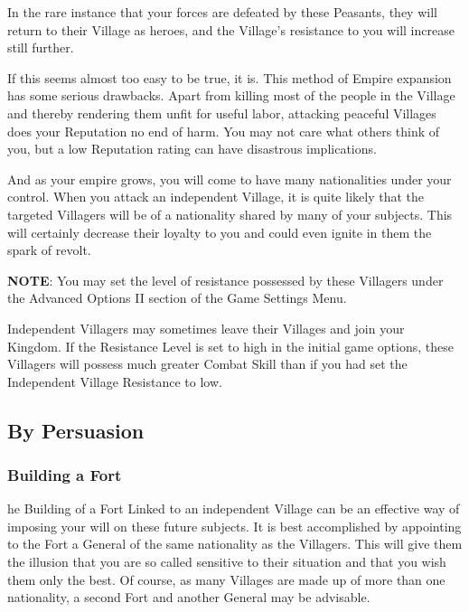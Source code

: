 In the rare instance that your forces are defeated by these Peasants, they will return to their Village as heroes, and the Village’s resistance to you will increase still further.

If this seems almost too easy to be true, it is. This method of Empire expansion has some serious drawbacks. Apart from killing most of the people in the Village and thereby rendering them unfit for useful labor, attacking peaceful Villages does your Reputation no end of harm. You may not care what others think of you, but a low Reputation rating can have disastrous implications.

And as your empire grows, you will come to have many nationalities under your control. When you attack an independent Village, it is quite likely that the targeted Villagers will be of a nationality shared by many of your subjects. This will certainly decrease their loyalty to you and could even ignite in them the spark of revolt.

\textbf{NOTE}: You may set the level of resistance possessed by these Villagers under the Advanced Options II section of the Game Settings Menu.

Independent Villagers may sometimes leave their Villages and join your Kingdom. If the Resistance Level is set to high in the initial game options, these Villagers will possess much greater Combat Skill than if you had set the Independent Village Resistance to low.

\subsection{By Persuasion}


\subsubsection{Building a Fort}

he Building of a Fort Linked to an independent Village can be an effective way of imposing your will on these future subjects. It is best accomplished by appointing to the Fort a General of the same nationality as the Villagers. This will give them the illusion that you are so called sensitive to their situation and that you wish them only the best. Of course, as many Villages are made up of more than one nationality, a second Fort and another General may be advisable.

